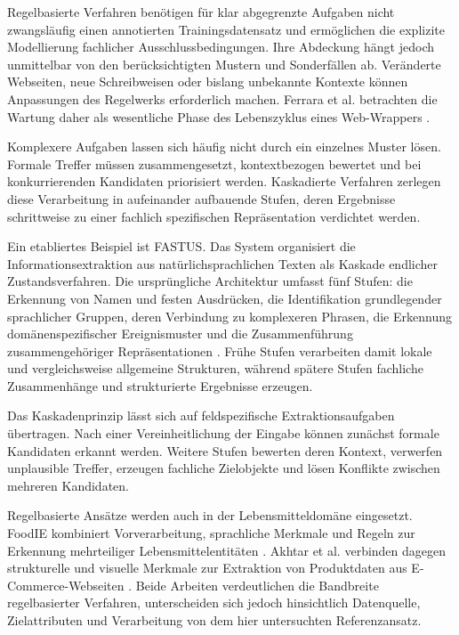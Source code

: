 Regelbasierte Verfahren benötigen für klar abgegrenzte Aufgaben nicht zwangsläufig einen annotierten Trainingsdatensatz und ermöglichen die explizite Modellierung 
fachlicher Ausschlussbedingungen. Ihre Abdeckung hängt jedoch unmittelbar von den berücksichtigten Mustern und Sonderfällen ab. Veränderte Webseiten, neue 
Schreibweisen oder bislang unbekannte Kontexte können Anpassungen des Regelwerks erforderlich machen. Ferrara et al. betrachten die Wartung daher als wesentliche 
Phase des Lebenszyklus eines Web-Wrappers \cite{ferrara2014web}.

Komplexere Aufgaben lassen sich häufig nicht durch ein einzelnes Muster lösen. Formale Treffer müssen zusammengesetzt, kontextbezogen bewertet und bei konkurrierenden 
Kandidaten priorisiert werden. Kaskadierte Verfahren zerlegen diese Verarbeitung in aufeinander aufbauende Stufen, deren Ergebnisse schrittweise zu einer 
fachlich spezifischen Repräsentation verdichtet werden.

Ein etabliertes Beispiel ist FASTUS. Das System organisiert die Informationsextraktion aus natürlichsprachlichen Texten als Kaskade endlicher Zustandsverfahren. 
Die ursprüngliche Architektur umfasst fünf Stufen: die Erkennung von Namen und festen Ausdrücken, die Identifikation grundlegender sprachlicher Gruppen, deren 
Verbindung zu komplexeren Phrasen, die Erkennung domänenspezifischer Ereignismuster und die Zusammenführung zusammengehöriger Repräsentationen \cite{hobbs1997fastus}. 
Frühe Stufen verarbeiten damit lokale und vergleichsweise allgemeine Strukturen, während spätere Stufen fachliche Zusammenhänge und strukturierte Ergebnisse erzeugen.

Das Kaskadenprinzip lässt sich auf feldspezifische Extraktionsaufgaben übertragen. Nach einer Vereinheitlichung der Eingabe können zunächst formale Kandidaten erkannt 
werden. Weitere Stufen bewerten deren Kontext, verwerfen unplausible Treffer, erzeugen fachliche Zielobjekte und lösen Konflikte zwischen mehreren Kandidaten.

Regelbasierte Ansätze werden auch in der Lebensmitteldomäne eingesetzt. FoodIE kombiniert Vorverarbeitung, sprachliche Merkmale und Regeln zur Erkennung mehrteiliger 
Lebensmittelentitäten \cite{popovski2019foodie}. Akhtar et al. verbinden dagegen strukturelle und visuelle Merkmale zur Extraktion von Produktdaten aus 
E-Commerce-Webseiten \cite{akhtar2020efficient}. Beide Arbeiten verdeutlichen die Bandbreite regelbasierter Verfahren, unterscheiden sich jedoch hinsichtlich 
Datenquelle, Zielattributen und Verarbeitung von dem hier untersuchten Referenzansatz.

